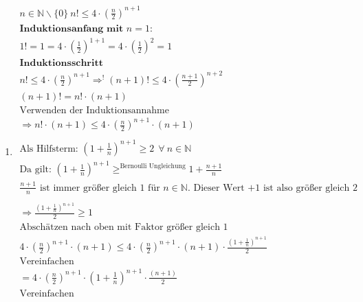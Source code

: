 \documentclass{article}
\begin{document}
\begin{enumerate}[label = (\alph*)]
            \item
                \begin{gather*}
                    n \in \mathbb{N} \backslash \{0\} \: n! \leq 4 \cdot { \left( \frac{n}{2} \right) }^{n+1} \\
                    \textbf{Induktionsanfang mit } n=1: \\
                    1! = 1 = 4 \cdot {\left( \frac{1}{2} \right) }^{1+1} = 4 \cdot {\left( \frac{1}{2} \right)}^{2} = 1 \\
                    \textbf{Induktionsschritt} \\
                    n! \leq 4 \cdot {\left( \frac{n}{2} \right) }^{n+1} \Rightarrow^! (n+1)! \leq 4 \cdot {\left( \frac{n+1}{2} \right) }^{n+2} \\
                    (n+1)! = n! \cdot (n+1) \\
                    \text{Verwenden der Induktionsannahme} \\
                    \Rightarrow n! \cdot (n+1) \leq 4 \cdot {\left( \frac{n}{2} \right) }^{n+1} \cdot (n + 1) \\
                    \\
                    \text{Als Hilfsterm: } {\left( 1 + \frac{1}{n} \right)}^{n+1} \geq 2 \: \: \forall \: n \in \mathbb{N} \\
                    \text{Da gilt: }
                    {\left(1 + \frac{1}{n} \right) }^{n+1} \geq^\text{Bernoulli Ungleichung} 1 + \frac{n+1}{n}\\
                    \frac{n+1}{n} \text{ ist immer größer gleich 1 für } n \in \mathbb{N} \text{. Dieser Wert +1 ist also größer gleich 2} \\
                    \\
                    \Rightarrow \frac{{(1 + \frac{1}{n})}^{n+1}}{2} \geq 1 \\
                    \text{Abschätzen nach oben mit Faktor größer gleich 1} \\
                    4 \cdot {\left( \frac{n}{2} \right) }^{n+1} \cdot (n + 1) \leq  4 \cdot {\left( \frac{n}{2} \right) }^{n+1} \cdot (n + 1) \cdot \frac{{(1 + \frac{1}{n})}^{n+1}}{2} \\
                    \text{Vereinfachen} \\
                    = 4 \cdot {\left( \frac{n}{2} \right) }^{n+1} \cdot {(1 + \frac{1}{n})}^{n+1} \cdot \frac{(n + 1)}{2} \\
                    \text{Vereinfachen} \\

\end{gather*}
\end{enumerate}
\end{document}
